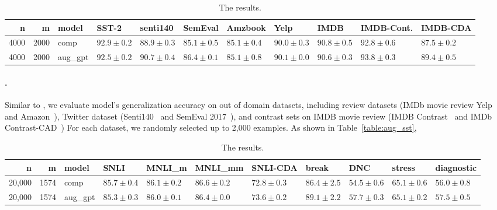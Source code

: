\begin{table}
\small
\centering
\setlength{\tabcolsep}{4pt}
\begin{tabular}{rrlllllllll}
\toprule
    n &     m &    model &          SST-2 &       senti140 &        SemEval &        Amzbook &           Yelp &           IMDB &     IMDB-Cont. &       IMDB-CDA \\
\midrule
 4000 &  2000 &     comp &  $92.9\pm 0.2$ &  $88.9\pm 0.3$ &  $85.1\pm 0.5$ &  $85.1\pm 0.4$ &  $90.0\pm 0.3$ &  $90.8\pm 0.5$ &  $92.8\pm 0.6$ &  $87.5\pm 0.2$ \\
 4000 &  2000 &  aug\_gpt &  $92.5\pm 0.2$ &  $90.7\pm 0.4$ &  $86.4\pm 0.1$ &  $85.1\pm 0.8$ &  $90.1\pm 0.0$ &  $90.6\pm 0.3$ &  $93.8\pm 0.3$ &  $89.4\pm 0.5$ \\
\bottomrule
\end{tabular}

\caption{The \sst results. }
\label{table:sst_result}
\end{table}


\paragraph{\sst.}
 Similar to \citet{kaushik2019learning}, we evaluate \sst model's generalization accuracy on out of domain datasets, including review datasets (IMDb movie review Yelp~\cite{} and Amazon~\cite{}), Twitter dataset (Senti140~\cite{} and SemEval 2017~\cite{}), and contrast sets on IMDB movie review (IMDB Contrast~\cite{} and IMDb Contrast-CAD~\cite{})  
For each dataset, we randomly selected up to 2,000 examples.
As shown in Table~\ref{table:aug_sst}, 


\begin{table}
\small
\centering
\setlength{\tabcolsep}{4pt}
\begin{tabular}{rrlllllllll}
\toprule
     n &     m &    model &           SNLI &         MNLI\_m &        MNLI\_mm &       SNLI-CDA &          break &            DNC &         stress &     diagnostic \\
\midrule
 20,000 &  1574 &     comp &  $85.7\pm 0.4$&  $86.1\pm 0.2$&  $86.6\pm 0.2$&  $72.8\pm 0.3$&  $86.4\pm 2.5$&  $54.5\pm 0.6$&  $65.1\pm 0.6$&  $56.0\pm 0.8$\\
 20,000 &  1574 &  aug\_gpt &  $85.3\pm 0.3$&  $86.0\pm 0.1$&  $86.4\pm 0.0$&  $73.6\pm 0.2$&  $89.1\pm 2.2$&  $57.7\pm 0.3$&  $65.1\pm 0.2$&  $57.5\pm 0.5$\\
\bottomrule
\end{tabular}
\caption{The \nli results. }
\label{table:nli_result}
\end{table}


